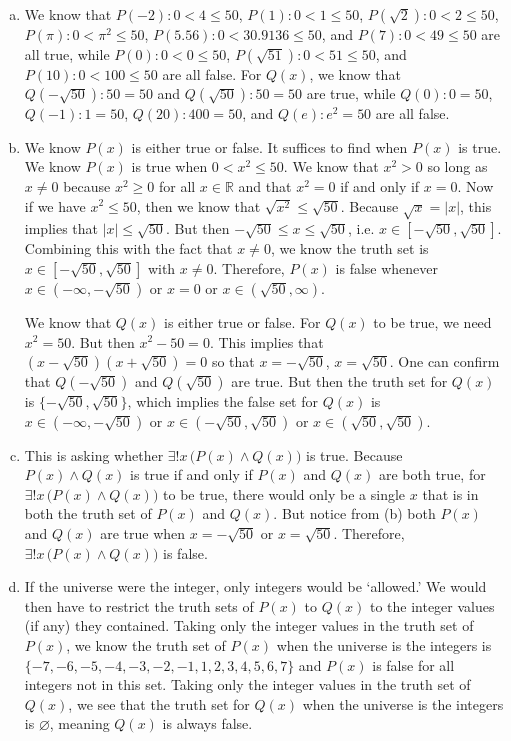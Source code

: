 \documentclass[11pt,letterpaper]{article}
\begin{document}
\sol 
\begin{enumerate}[(a)]
\item We know that $P(-2): 0 < 4 \leq 50$, $P(1): 0 < 1 \leq 50$, $P(\sqrt{2}): 0 < 2 \leq 50$, $P(\pi): 0 < \pi^2 \leq 50$, $P(5.56): 0 < 30.9136 \leq 50$, and $P(7): 0 < 49 \leq 50$ are all true, while $P(0): 0 < 0 \leq 50$, $P(\sqrt{51}): 0 < 51 \leq 50$, and $P(10): 0 < 100 \leq 50$ are all false. For $Q(x)$, we know that $Q(-\sqrt{50}): 50= 50$ and $Q(\sqrt{50}): 50= 50$ are true, while $Q(0): 0 = 50$, $Q(-1): 1= 50$, $Q(20): 400= 50$, and $Q(e): e^2= 50$ are all false. \pspace

\item We know $P(x)$ is either true or false. It suffices to find when $P(x)$ is true. We know $P(x)$ is true when $0 < x^2 \leq 50$. We know that $x^2 > 0$ so long as $x \neq 0$ because $x^2 \geq 0$ for all $x \in \mathbb{R}$ and that $x^2= 0$ if and only if $x= 0$. Now if we have $x^2 \leq 50$, then we know that $\sqrt{x^2} \leq \sqrt{50}$. Because $\sqrt{x}= |x|$, this implies that $|x| \leq \sqrt{50}$. But then $-\sqrt{50} \leq x \leq \sqrt{50}$, i.e. $x \in [-\sqrt{50}, \sqrt{50}]$. Combining this with the fact that $x \neq 0$, we know the truth set is $x \in [-\sqrt{50}, \sqrt{50}]$ with $x \neq 0$. Therefore, $P(x)$ is false whenever $x \in (-\infty, -\sqrt{50})$ or $x= 0$ or $x \in (\sqrt{50}, \infty)$. \pspace

We know that $Q(x)$ is either true or false. For $Q(x)$ to be true, we need $x^2= 50$. But then $x^2 - 50= 0$. This implies that $(x - \sqrt{50})(x + \sqrt{50})= 0$ so that $x= -\sqrt{50}$, $x= \sqrt{50}$. One can confirm that $Q(-\sqrt{50})$ and $Q(\sqrt{50})$ are true. But then the truth set for $Q(x)$ is $\{ -\sqrt{50}, \sqrt{50} \}$, which implies the false set for $Q(x)$ is $x \in (-\infty, -\sqrt{50})$ or $x \in (-\sqrt{50}, \sqrt{50})$ or $x \in (\sqrt{50}, \sqrt{50})$. \pspace

\item This is asking whether $\exists! x\, \big( P(x) \wedge Q(x) \big)$ is true. Because $P(x) \wedge Q(x)$ is true if and only if $P(x)$ and $Q(x)$ are both true, for $\exists! x\, \big( P(x) \wedge Q(x) \big)$ to be true, there would only be a single $x$ that is in both the truth set of $P(x)$ and $Q(x)$. But notice from (b) both $P(x)$ and $Q(x)$ are true when $x= -\sqrt{50}$ or $x= \sqrt{50}$. Therefore, $\exists! x\, \big( P(x) \wedge Q(x) \big)$ is false. \pspace

\item If the universe were the integer, only integers would be `allowed.' We would then have to restrict the truth sets of $P(x)$ to $Q(x)$ to the integer values (if any) they contained. Taking only the integer values in the truth set of $P(x)$, we know the truth set of $P(x)$ when the universe is the integers is $\{ -7, -6, -5, -4, -3, -2, -1, 1, 2, 3, 4, 5, 6, 7 \}$ and $P(x)$ is false for all integers not in this set. Taking only the integer values in the truth set of $Q(x)$, we see that the truth set for $Q(x)$ when the universe is the integers is $\varnothing$, meaning $Q(x)$ is always false.
\end{enumerate}
\end{document}
